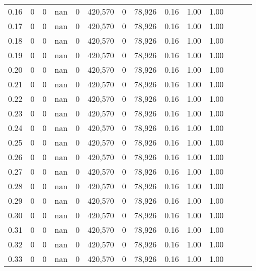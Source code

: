 \begin{tabular}{rrrrrrrrrrrrrr}
0.16 &       0 &       0 &   nan &        0 &  420,570 &       0 &  78,926 &  0.16 &  1.00 &      1.00 \\
0.17 &       0 &       0 &   nan &        0 &  420,570 &       0 &  78,926 &  0.16 &  1.00 &      1.00 \\
0.18 &       0 &       0 &   nan &        0 &  420,570 &       0 &  78,926 &  0.16 &  1.00 &      1.00 \\
0.19 &       0 &       0 &   nan &        0 &  420,570 &       0 &  78,926 &  0.16 &  1.00 &      1.00 \\
0.20 &       0 &       0 &   nan &        0 &  420,570 &       0 &  78,926 &  0.16 &  1.00 &      1.00 \\
0.21 &       0 &       0 &   nan &        0 &  420,570 &       0 &  78,926 &  0.16 &  1.00 &      1.00 \\
0.22 &       0 &       0 &   nan &        0 &  420,570 &       0 &  78,926 &  0.16 &  1.00 &      1.00 \\
0.23 &       0 &       0 &   nan &        0 &  420,570 &       0 &  78,926 &  0.16 &  1.00 &      1.00 \\
0.24 &       0 &       0 &   nan &        0 &  420,570 &       0 &  78,926 &  0.16 &  1.00 &      1.00 \\
0.25 &       0 &       0 &   nan &        0 &  420,570 &       0 &  78,926 &  0.16 &  1.00 &      1.00 \\
0.26 &       0 &       0 &   nan &        0 &  420,570 &       0 &  78,926 &  0.16 &  1.00 &      1.00 \\
0.27 &       0 &       0 &   nan &        0 &  420,570 &       0 &  78,926 &  0.16 &  1.00 &      1.00 \\
0.28 &       0 &       0 &   nan &        0 &  420,570 &       0 &  78,926 &  0.16 &  1.00 &      1.00 \\
0.29 &       0 &       0 &   nan &        0 &  420,570 &       0 &  78,926 &  0.16 &  1.00 &      1.00 \\
0.30 &       0 &       0 &   nan &        0 &  420,570 &       0 &  78,926 &  0.16 &  1.00 &      1.00 \\
0.31 &       0 &       0 &   nan &        0 &  420,570 &       0 &  78,926 &  0.16 &  1.00 &      1.00 \\
0.32 &       0 &       0 &   nan &        0 &  420,570 &       0 &  78,926 &  0.16 &  1.00 &      1.00 \\
0.33 &       0 &       0 &   nan &        0 &  420,570 &       0 &  78,926 &  0.16 &  1.00 &      1.00 \\

\end{tabular}
